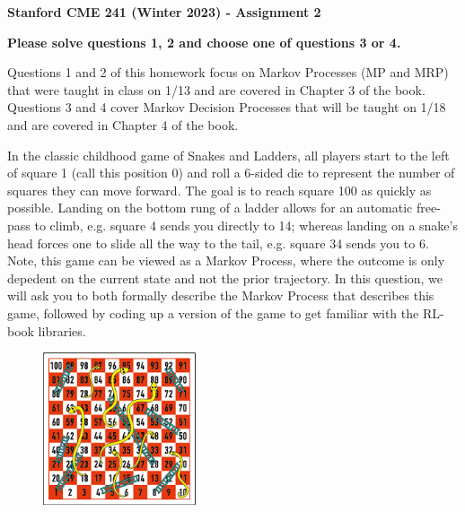 \documentclass[12pt]{exam}
\begin{document}
\begin{center}
{\large {\bf Stanford CME 241 (Winter 2023) - Assignment 2}}
\end{center}
 

\noindent \textbf{Please solve questions 1, 2 and choose one of questions 3 or 4. }

\noindent Questions 1 and 2 of this homework focus on Markov Processes (MP and MRP) that were taught in class on 1/13 and are covered in Chapter 3 of the book. Questions 3 and 4 cover Markov Decision Processes that will be taught on 1/18 and are covered in Chapter 4 of the book.

\begin{questions}
\question In the classic childhood game of Snakes and Ladders, all players start to the left of square 1 (call this position 0) and roll a 6-sided die to represent the number of squares they can move forward. The goal is to reach square 100 as quickly as possible. Landing on the bottom rung of a ladder allows for an automatic free-pass to climb, e.g. square 4 sends you directly to 14; whereas landing on a snake's head forces one to slide all the way to the tail, e.g. square 34 sends you to 6. Note, this game can be viewed as a Markov Process, where the outcome is only depedent on the current state and not the prior trajectory. In this question, we will ask you to both formally describe the Markov Process that describes this game, followed by coding up a version of the game to get familiar with the RL-book libraries.

\begin{figure}[h]
	\begin{center}
	\includegraphics[width=0.4\textwidth]{Figures/2_snakes_and_ladders.png}
	\end{center}
\end{figure}


\end{questions}
\end{document}
